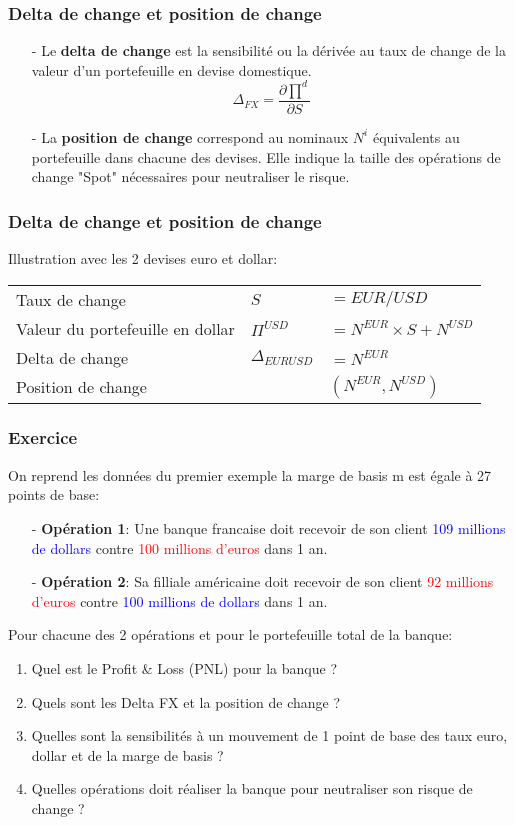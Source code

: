 \documentclass{beamer}
\begin{document}
\begin{frame}
\frametitle{Delta de change et position de change}
\begin{itemize}
\item[-] Le \textbf{delta de change} est la sensibilité ou la dérivée au taux de change de la valeur d'un portefeuille en devise domestique.\\
\vspace{0.5cm}
\[
\Delta_{FX}=\frac{\partial \prod^d}{\partial S}
\]
\item[-] La \textbf{position de change} correspond au nominaux $N^i$  équivalents au portefeuille dans chacune des devises. Elle indique la taille des opérations de change "Spot" nécessaires pour neutraliser le risque.

\end{itemize}
\end{frame}

\begin{frame}
\frametitle{Delta de change et position de change}
\small
Illustration avec les 2 devises euro et dollar:\\ 
\vspace{0.5cm}
\begin{tabular}{|l|l l|}
\hline
Taux de change&$S$&$= EUR/USD$\\
Valeur du portefeuille en dollar&$\Pi^{USD}$&$=N^{EUR} \times S + N^{USD}$\\
Delta de change&$\Delta_{EURUSD}$&$=N^{EUR}$\\
Position de change&&$(N^{EUR},N^{USD})$\\
\hline
\end{tabular}
\end{frame}

\begin{frame}
\frametitle{Exercice}
On reprend les données du premier exemple la marge de basis m est égale à 27 points de base:\\
\begin{itemize}
\item[-] \textbf{Opération 1}: Une banque francaise doit recevoir de son client \textcolor{blue}{109 millions de dollars} contre \textcolor{red}{100 millions d'euros} dans 1 an.
\item[-] \textbf{Opération 2}: Sa filliale américaine doit recevoir de son client \textcolor{red}{92 millions d'euros} contre \textcolor{blue}{100 millions de dollars} dans 1 an.
\end{itemize}
Pour chacune des 2 opérations et pour le portefeuille total de la banque:\\
\begin{enumerate}
\item Quel est le Profit \& Loss (PNL) pour la banque ?
\item Quels sont les Delta FX et la position de change ?
\item Quelles sont la sensibilités à un mouvement de 1 point de base des taux euro, dollar et de la marge de basis ?
\item Quelles opérations doit réaliser la banque pour neutraliser son risque de change ?
\end{enumerate}
\end{frame}
\end{document}
